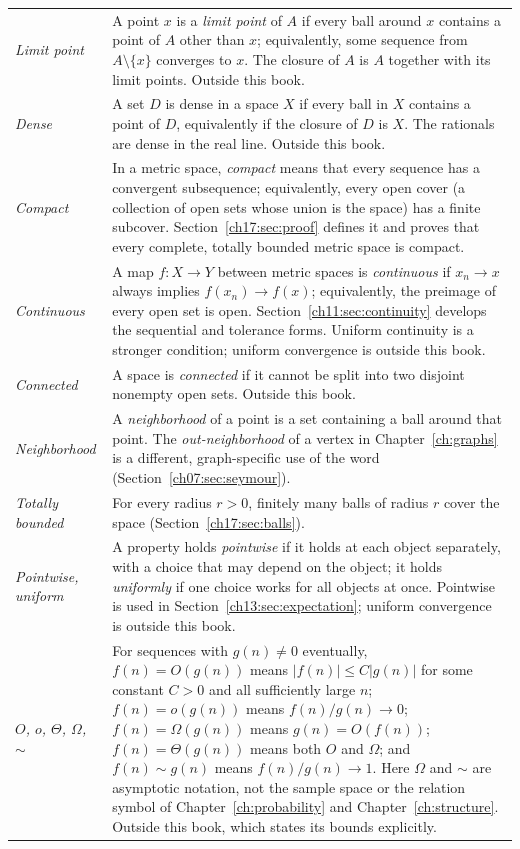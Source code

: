 \begin{longtable}{@{}>{\raggedright\arraybackslash}p{1.35in}>{\raggedright\arraybackslash}p{3.85in}@{}}
\emph{Limit point} & A point $x$ is a \emph{limit point} of $A$ if every ball around $x$ contains a point of $A$ other than $x$; equivalently, some sequence from $A\setminus\{x\}$ converges to $x$. The closure of $A$ is $A$ together with its limit points. Outside this book.\\
\emph{Dense} & A set $D$ is dense in a space $X$ if every ball in $X$ contains a point of $D$, equivalently if the closure of $D$ is $X$. The rationals are dense in the real line. Outside this book.\\
\emph{Compact} & In a metric space, \emph{compact} means that every sequence has a convergent subsequence; equivalently, every open cover (a collection of open sets whose union is the space) has a finite subcover. Section~\ref{ch17:sec:proof} defines it and proves that every complete, totally bounded metric space is compact.\\
\emph{Continuous} & A map $f:X\to Y$ between metric spaces is \emph{continuous} if $x_n\to x$ always implies $f(x_n)\to f(x)$; equivalently, the preimage of every open set is open. Section~\ref{ch11:sec:continuity} develops the sequential and tolerance forms. Uniform continuity is a stronger condition; uniform convergence is outside this book.\\
\emph{Connected} & A space is \emph{connected} if it cannot be split into two disjoint nonempty open sets. Outside this book.\\
\emph{Neighborhood} & A \emph{neighborhood} of a point is a set containing a ball around that point. The \emph{out-neighborhood} of a vertex in Chapter~\ref{ch:graphs} is a different, graph-specific use of the word (Section~\ref{ch07:sec:seymour}).\\
\emph{Totally bounded} & For every radius $r>0$, finitely many balls of radius $r$ cover the space (Section~\ref{ch17:sec:balls}).\\
\emph{Pointwise, uniform} & A property holds \emph{pointwise} if it holds at each object separately, with a choice that may depend on the object; it holds \emph{uniformly} if one choice works for all objects at once. Pointwise is used in Section~\ref{ch13:sec:expectation}; uniform convergence is outside this book.\\
\emph{$O$, $o$, $\Theta$, $\Omega$, $\sim$} & For sequences with $g(n)\ne0$ eventually, $f(n)=O(g(n))$ means $|f(n)|\le C|g(n)|$ for some constant $C>0$ and all sufficiently large $n$; $f(n)=o(g(n))$ means $f(n)/g(n)\to0$; $f(n)=\Omega(g(n))$ means $g(n)=O(f(n))$; $f(n)=\Theta(g(n))$ means both $O$ and $\Omega$; and $f(n)\sim g(n)$ means $f(n)/g(n)\to1$. Here $\Omega$ and $\sim$ are asymptotic notation, not the sample space or the relation symbol of Chapter~\ref{ch:probability} and Chapter~\ref{ch:structure}. Outside this book, which states its bounds explicitly.\\

\end{longtable}
